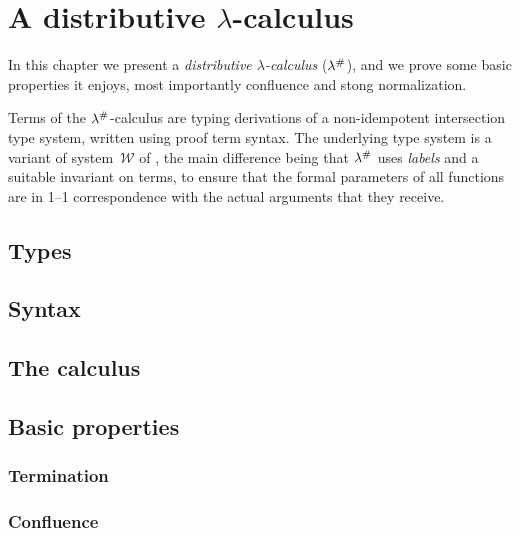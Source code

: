 \chapter{A distributive $\lambda$-calculus}

In this chapter we present a
{\em distributive $\lambda$-calculus} ($\lambda^{\mathtt{\#}}$),
and we prove some basic properties it enjoys,
most importantly confluence and stong normalization.

Terms of the $\lambda^{\mathtt{\#}}$-calculus are typing derivations of a non-idempotent intersection type
system, written using proof term syntax.
The underlying type system is a variant of
system~$\mathcal{W}$ of \cite{bucciarelli2014inhabitation,bucciarelli2017non},
the main difference being that $\lambda^{\mathtt{\#}}$
uses {\em labels} and a suitable invariant on terms,
to ensure that the formal parameters of all functions
are in 1--1 correspondence with the actual arguments that they receive.

\section{Types}


\section{Syntax}


\section{The calculus}


\section{Basic properties}


\subsection*{Termination}


\subsection*{Confluence}


